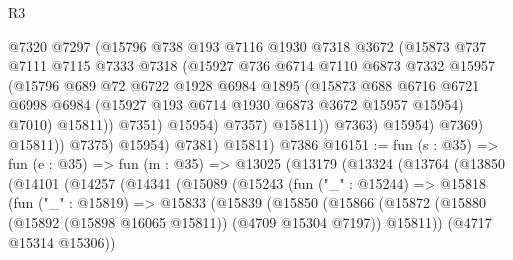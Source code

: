 \begin{lexlean}{R3}
\begin{coremodule}
                            @7320
                            @7297
                            (@15796
                              @738
                              @193
                              @7116
                              @1930
                              @7318
                              @3672
                              (@15873
                                @737
                                @7111
                                @7115
                                @7333
                                @7318
                                (@15927
                                  @736
                                  @6714
                                  @7110
                                  @6873
                                  @7332
                                  @15957
                                  (@15796
                                    @689
                                    @72
                                    @6722
                                    @1928
                                    @6984
                                    @1895
                                    (@15873
                                      @688
                                      @6716
                                      @6721
                                      @6998
                                      @6984
                                      (@15927 @193 @6714 @1930 @6873 @3672 @15957 @15954)
                                      @7010)
                                    @15811))
                                @7351)
                              @15954)
                            @7357)
                          @15811))
                      @7363)
                    @15954)
                  @7369)
                @15811))
            @7375)
          @15954)
        @7381)
      @15811)
    @7386
@16151 := fun (s : @35) =>
  fun (e : @35) =>
  fun (m : @35) =>
  @13025
    (@13179
      (@13324
        (@13764
          (@13850
            (@14101
              (@14257
                (@14341
                  (@15089
                    (@15243
                      (fun ("_" : @15244) =>
                      @15818
                        (fun ("_" : @15819) =>
                        @15833
                          (@15839
                            (@15850
                              (@15866
                                (@15872
                                  (@15880 (@15892 (@15898 @16065 @15811)) (@4709 @15304 @7197))
                                  @15811))
                              (@4717 @15314 @15306))

\end{coremodule}
\end{lexlean}
